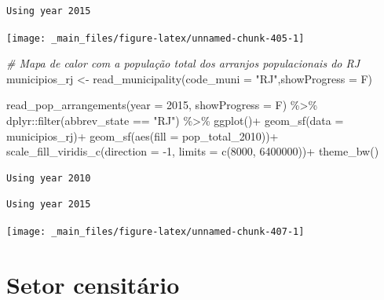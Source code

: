 \documentclass[
  brazilian,
]{book}
\newenvironment{Shaded}{\begin{snugshade}}{\end{snugshade}}
\newcommand{\AttributeTok}[1]{\textcolor[rgb]{0.77,0.63,0.00}{#1}}
\newcommand{\CommentTok}[1]{\textcolor[rgb]{0.56,0.35,0.01}{\textit{#1}}}
\newcommand{\DecValTok}[1]{\textcolor[rgb]{0.00,0.00,0.81}{#1}}
\newcommand{\FunctionTok}[1]{\textcolor[rgb]{0.00,0.00,0.00}{#1}}
\newcommand{\NormalTok}[1]{#1}
\newcommand{\OtherTok}[1]{\textcolor[rgb]{0.56,0.35,0.01}{#1}}
\newcommand{\SpecialCharTok}[1]{\textcolor[rgb]{0.00,0.00,0.00}{#1}}
\newcommand{\StringTok}[1]{\textcolor[rgb]{0.31,0.60,0.02}{#1}}
\begin{document}
\begin{verbatim}
Using year 2015
\end{verbatim}

\begin{center}\texttt{[image: \_main\_files/figure-latex/unnamed-chunk-405-1]} \end{center}

\begin{Shaded}
\begin{Highlighting}[]
\CommentTok{\# Mapa de calor com a população total dos arranjos populacionais do RJ}
\NormalTok{municipios\_rj }\OtherTok{\textless{}{-}} \FunctionTok{read\_municipality}\NormalTok{(}\AttributeTok{code\_muni =} \StringTok{"RJ"}\NormalTok{,}\AttributeTok{showProgress =}\NormalTok{ F)}

\FunctionTok{read\_pop\_arrangements}\NormalTok{(}\AttributeTok{year =} \DecValTok{2015}\NormalTok{,}
                      \AttributeTok{showProgress =}\NormalTok{ F) }\SpecialCharTok{\%\textgreater{}\%}
\NormalTok{  dplyr}\SpecialCharTok{::}\FunctionTok{filter}\NormalTok{(abbrev\_state }\SpecialCharTok{==} \StringTok{"RJ"}\NormalTok{) }\SpecialCharTok{\%\textgreater{}\%} 
  \FunctionTok{ggplot}\NormalTok{()}\SpecialCharTok{+}
  \FunctionTok{geom\_sf}\NormalTok{(}\AttributeTok{data =}\NormalTok{ municipios\_rj)}\SpecialCharTok{+}
  \FunctionTok{geom\_sf}\NormalTok{(}\FunctionTok{aes}\NormalTok{(}\AttributeTok{fill =}\NormalTok{ pop\_total\_2010))}\SpecialCharTok{+}
  \FunctionTok{scale\_fill\_viridis\_c}\NormalTok{(}\AttributeTok{direction =} \SpecialCharTok{{-}}\DecValTok{1}\NormalTok{, }\AttributeTok{limits =} \FunctionTok{c}\NormalTok{(}\DecValTok{8000}\NormalTok{, }\DecValTok{6400000}\NormalTok{))}\SpecialCharTok{+}
  \FunctionTok{theme\_bw}\NormalTok{()}
\end{Highlighting}
\end{Shaded}

\begin{verbatim}
Using year 2010
\end{verbatim}

\begin{verbatim}
Using year 2015
\end{verbatim}

\begin{center}\texttt{[image: \_main\_files/figure-latex/unnamed-chunk-407-1]} \end{center}

\hypertarget{setor-censituxe1rio}{%
\section{Setor censitário}\label{setor-censituxe1rio}}
\end{document}

